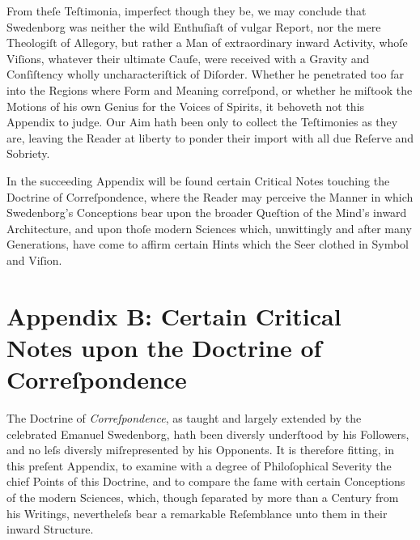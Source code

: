 \documentclass[12pt]{book}
\begin{document}
\vspace{1.2em}

\noindent
From theſe Teſtimonia, imperfect though they be, we may conclude that Swedenborg was neither the wild Enthuſiaſt of vulgar Report, nor the mere Theologiſt of Allegory, but rather a Man of extraordinary inward Activity, whoſe Viſions, whatever their ultimate Cauſe, were received with a Gravity and Conſiſtency wholly uncharacteriſtick of Diſorder. Whether he penetrated too far into the Regions where Form and Meaning correſpond, or whether he miſtook the Motions of his own Genius for the Voices of Spirits, it behoveth not this Appendix to judge. Our Aim hath been only to collect the Teſtimonies as they are, leaving the Reader at liberty to ponder their import with all due Reſerve and Sobriety.

\vspace{1.2em}

\noindent
In the succeeding Appendix will be found certain Critical Notes touching the Doctrine of Correſpondence, where the Reader may perceive the Manner in which Swedenborg’s Conceptions bear upon the broader Queſtion of the Mind’s inward Architecture, and upon thoſe modern Sciences which, unwittingly and after many Generations, have come to affirm certain Hints which the Seer clothed in Symbol and Viſion.


\newpage
\section*{Appendix B: Certain Critical Notes upon the Doctrine of Correſpondence}


\noindent
The Doctrine of \textit{Correſpondence}, as taught and largely extended by the celebrated Emanuel Swedenborg, hath been diversly underſtood by his Followers, and no leſs diversly miſrepresented by his Opponents. It is therefore fitting, in this preſent Appendix, to examine with a degree of Philoſophical Severity the chief Points of this Doctrine, and to compare the ſame with certain Conceptions of the modern Sciences, which, though ſeparated by more than a Century from his Writings, nevertheleſs bear a remarkable Reſemblance unto them in their inward Structure.

\vspace{1em}
\end{document}
